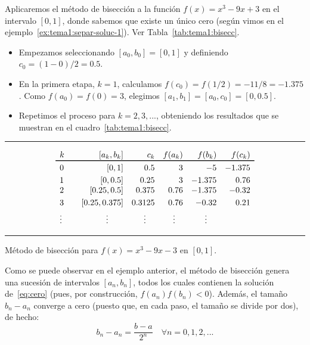 \begin{example}
  Aplicaremos el método de bisección a la función $f(x)=x^3-9x+3$ en el intervalo
  $[0,1]$, donde sabemos que existe un único cero (según vimos en el
  ejemplo~\ref{ex:tema1:separ-soluc-1}). Ver
  Tabla~\ref{tab:tema1:bisecc}.

  \begin{itemize}
  \item Empezamos seleccionando $[a_0,b_0]=[0,1]$ y definiendo
    $c_0=(1-0)/2=0.5$.
  \item En la primera etapa, $k=1$, calculamos
    $f(c_0)=f(1/2)=-11/8=-1.375$. Como $f(a_0)=f(0)=3$, elegimos
    $[a_1,b_1]=[a_0,c_0]=[0,0.5]$.
  \item Repetimos el proceso para $k=2,3,...$, obteniendo los resultados que se
    muestran en el cuadro~\ref{tab:tema1:bisecc}.
  \end{itemize}

\end{example}
\begin{table}
  \centering
  \rule{0.99\linewidth}{1.6pt}
  \begin{equation*}
    \begin{array}{l<{\quad}rrrrr}%
     k &  [a_k,b_k] & c_k & f(a_k) & f(b_k) & f(c_k) 
      \\ \toprule\mbox{}%
     0 & [0,1]  &  0.5 
      & 3 & -5 & -1.375
      \\ \noalign{\smallskip}
     1 &  [0,0.5] &  0.25
      & 3 & -1.375 & 0.76
      \\ \smallskip
     2 & [0.25,0.5] & 0.375
      & 0.76 & -1.375 & -0.32
     \\ \smallskip
     3& [0.25,0.375] & 0.3125
      & 0.76 & -0.32 & 0.21
      \\
      \hfill \vdots \hfill~ & \hfill \vdots \hfill~ & 
      \hfill \vdots \hfill~ & \hfill \vdots \hfill~ & \hfill \vdots \hfill~
    \end{array}
  \end{equation*}
  \rule{0.99\linewidth}{1.5pt}
  \caption{Método de bisección para $f(x)=x^3-9x-3$ en $[0,1]$.}
  \label{tab:tema1:bisecc}
\end{table}

Como se puede observar en el ejemplo anterior, el método de bisección
genera una sucesión de intervalos $[a_n,b_n]$, todos los cuales
contienen la solución de~\eqref{eq:cero} (pues, por construcción,
$f(a_n)f(b_n)<0$). Además, el tamaño $b_n-a_n$ converge a cero (puesto
que, en cada paso, el tamaño se divide por dos), de hecho:
\begin{equation}
  \label{eq:tema1:bisec:1}
  b_n-a_n = \frac{b-a}{2^n} \quad \forall n=0,1,2,...
\end{equation}

